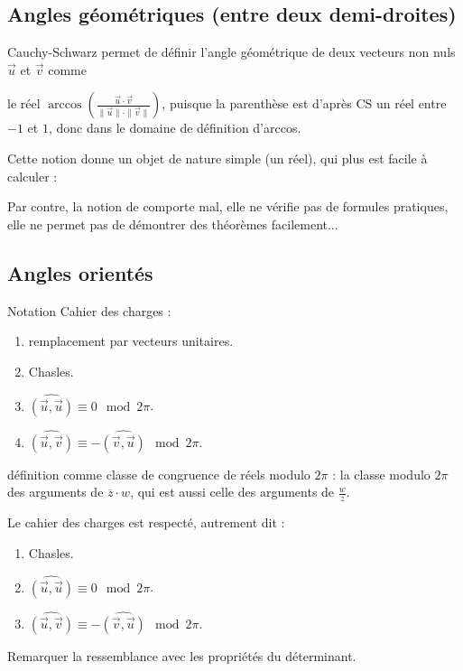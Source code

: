 \subsection{Angles géométriques (entre deux demi-droites)}

Cauchy-Schwarz permet de définir l'angle géométrique de deux vecteurs non nuls $\vec u$ et $\vec v$ comme

le réel $\arccos\left(\frac{\vec u\cdot \vec v}{\|\vec u\|\cdot \|\vec v\|}\right)$, puisque la parenthèse est d'après CS un réel entre $-1$ et $1$, donc dans le domaine de définition d'arccos.

Cette notion donne un objet de nature simple (un réel), qui plus est facile à calculer : 

\begin{exemples}
\end{exemples}

Par contre, la notion de comporte mal, elle ne vérifie pas de formules pratiques, elle ne permet pas de démontrer des théorèmes facilement...



\subsection{Angles orientés}

Notation
Cahier des charges : 
\begin{enumerate}
\item remplacement par vecteurs unitaires.
\item Chasles.
\item $\widehat{(\overrightarrow u, \overrightarrow u)} \equiv 0 \mod 2\pi$.
\item $\widehat{(\overrightarrow u, \overrightarrow v)} \equiv -\widehat{(\overrightarrow v, \overrightarrow u)} \mod 2\pi$.
\end{enumerate}

\begin{definition}
définition comme classe de congruence de réels modulo $2\pi$ : la classe modulo $2\pi$ des arguments de $\overline z\cdot w$, qui est aussi celle des arguments de $\frac{w}{z}$.
\end{definition}


\begin{proposition}
Le cahier des charges est respecté, autrement dit : 
\begin{enumerate}
\item Chasles.
\item $\widehat{(\overrightarrow u, \overrightarrow u)} \equiv 0 \mod 2\pi$.
\item $\widehat{(\overrightarrow u, \overrightarrow v)} \equiv -\widehat{(\overrightarrow v, \overrightarrow u)} \mod 2\pi$.
\end{enumerate}
\end{proposition}

\begin{remarque}
Remarquer la ressemblance avec les propriétés du déterminant.
\end{remarque}